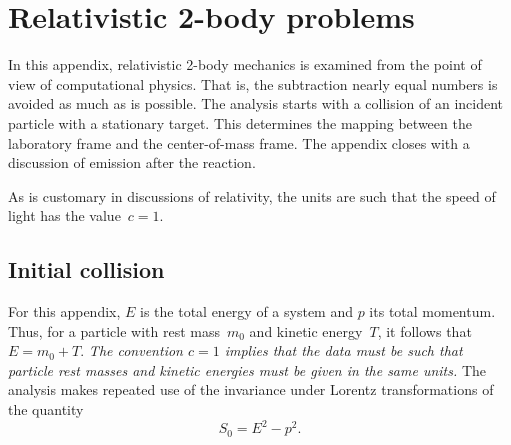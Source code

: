 { %
\newcommand{\mzerot}{m_{t,0}}
\newcommand{\mzeroi}{m_{i,0}}
\newcommand{\Ezerot}{m_t}
\newcommand{\Ezeroi}{m_i}
\newcommand{\EzeroR}{m_R}
\newcommand{\Ezeroe}{m_e}
\newcommand{\Tlabin}{T_{i,\textrm{lab}}}
\newcommand{\plabin}{p_{i,\textrm{lab}}}
\newcommand{\Tlabe}{T_{e,\textrm{lab}}}
\newcommand{\plabe}{p_{e,\textrm{lab}}}
\newcommand{\plabea}{p_{e1,\textrm{lab}}}
\newcommand{\plabeb}{p_{e2,\textrm{lab}}}
\newcommand{\plabec}{p_{e3,\textrm{lab}}}
\newcommand{\Tcmi}{T_{i,\textrm{cm}}}
\newcommand{\Tcmt}{T_{t,\textrm{cm}}}
\newcommand{\Tcme}{T_{e,\textrm{cm}}}
\newcommand{\TcmR}{T_{R,\textrm{cm}}}
\newcommand{\pcmi}{p_{i,\textrm{cm}}}
\newcommand{\pcme}{p_{e,\textrm{cm}}}
\newcommand{\pcmea}{p_{e1,\textrm{cm}}}
\newcommand{\pcmeb}{p_{e2,\textrm{cm}}}
\newcommand{\pcmec}{p_{e3,\textrm{cm}}}

\chapter{Relativistic 2-body problems}
\label{Appendix-relativity}
In this appendix, relativistic 2-body mechanics is examined from the point
of view of computational physics.  That is, the subtraction
nearly equal numbers is avoided as much as is possible.
The analysis starts with a collision of an incident particle with
a stationary target.  This determines the mapping between
the laboratory frame and the center-of-mass frame.  
The appendix closes with a discussion of
emission after the reaction. 

As is customary in discussions of relativity, the units are
such that the speed of light has the value~$c = 1$.

\section{Initial collision}
For this appendix, $E$ is the total energy of
a system
and $p$ its total momentum.  Thus, for a particle with rest mass~$m_0$
and kinetic energy~$T$, it follows that $E = m_0 + T$. 
\textit{The convention $c = 1$ implies that the data must be such that
particle rest masses and kinetic energies must be given in the same units.}
The analysis makes repeated use of the invariance under Lorentz
transformations of the quantity
\begin{equation}
  S_0 = E^2 - p^2.
  \label{spacetime}
\end{equation}

}
